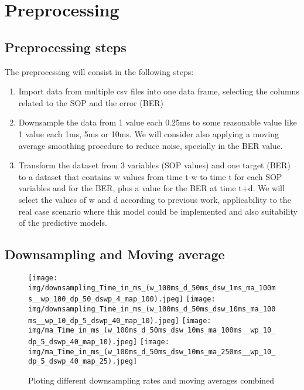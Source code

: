 \documentclass[a4paper]{article}
\begin{document}
\section{Preprocessing}

\subsection{Preprocessing steps}

The preprocessing will consist in the following steps:
\begin{enumerate}
\item Import data from multiple csv files into one data frame, selecting the columns related to the SOP and the error (BER)
\item Downsample the data from 1 value each 0.25ms to some reasonable value like 1 value each 1ms, 5ms or 10ms. We will consider also applying a moving average smoothing procedure to reduce noise, specially in the BER value.
\item Transform the dataset from 3 variables (SOP values) and one target (BER) to a dataset that contains w values from time t-w to time t for each SOP variables and for the BER, plus a value for the BER at time t+d.  We will select the values of w and d according to previous work,  applicability to the real case scenario where this model could be implemented and also suitability of the predictive models.
\end{enumerate}

\subsection{Downsampling and Moving average}



\begin{figure}[H]
%
  \centering
    \texttt{[image: img/downsampling\_Time\_in\_ms\_(w\_100ms\_d\_50ms\_dsw\_1ms\_ma\_100ms\_\_wp\_100\_dp\_50\_dswp\_4\_map\_100).jpeg]}
\endminipage\hfill
{}%
  \centering
    \texttt{[image: img/downsampling\_Time\_in\_ms\_(w\_100ms\_d\_50ms\_dsw\_10ms\_ma\_100ms\_\_wp\_10\_dp\_5\_dswp\_40\_map\_10).jpeg]}
\endminipage\vfill
{}%
  \centering
    \texttt{[image: img/ma\_Time\_in\_ms\_(w\_100ms\_d\_50ms\_dsw\_10ms\_ma\_100ms\_\_wp\_10\_dp\_5\_dswp\_40\_map\_10).jpeg]}
\endminipage\hfill
{}%
  \centering
    \texttt{[image: img/ma\_Time\_in\_ms\_(w\_100ms\_d\_50ms\_dsw\_10ms\_ma\_250ms\_\_wp\_10\_dp\_5\_dswp\_40\_map\_25).jpeg]}
\endminipage

\caption{Ploting different downsampling rates and moving averages combined}
\end{figure}
\end{document}
